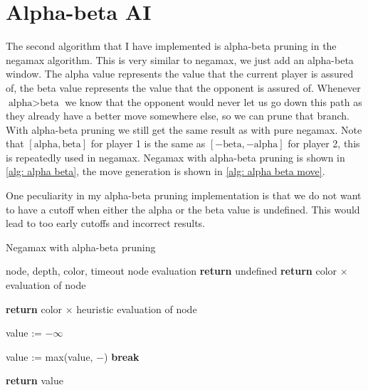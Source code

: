 \documentclass[a4paper]{article}
\begin{document}
\pagebreak
\section{Alpha-beta AI}

The second algorithm that I have implemented is alpha-beta pruning in the
negamax algorithm. This is very similar to negamax, we just add an alpha-beta
window. The alpha value represents the value that the current player is assured
of, the beta value represents the value that the opponent is assured of.
Whenever $\text{alpha} > \text{beta}$ we know that the opponent would never let
us go down this path as they already have a better move somewhere else, so we
can prune that branch. With alpha-beta pruning we still get the same result as
with pure negamax. Note that $[\text{alpha}, \text{beta}]$ for player 1 is the
same as $[-\text{beta}, -\text{alpha}]$ for player 2, this is repeatedly used
in negamax. Negamax with alpha-beta pruning is shown in \ref{alg: alpha beta},
the move generation is shown in \ref{alg: alpha beta move}.

One peculiarity in my alpha-beta pruning implementation is that we do not want
to have a cutoff when either the alpha or the beta value is undefined. This
would lead to too early cutoffs and incorrect results.

\begin{algorithm}
	\caption{Negamax with alpha-beta pruning}
	\label{alg: alpha beta}
	\begin{algorithmic}[1]
		\Require node, depth, color, timeout
		\Ensure node evaluation
				\State \textbf{return} undefined
			\EndIf
				\State \textbf{return} color $\times$ evaluation of node
			\EndIf

				\State \textbf{return} color $\times$ heuristic evaluation of node
			\EndIf

			\State value := $-\infty$

				\State value := max(value, $-$)
					\State \textbf{break}
				\EndIf
			\EndFor

			\State \textbf{return} value
		\EndFunction
	\end{algorithmic}
\end{algorithm}
\end{document}
